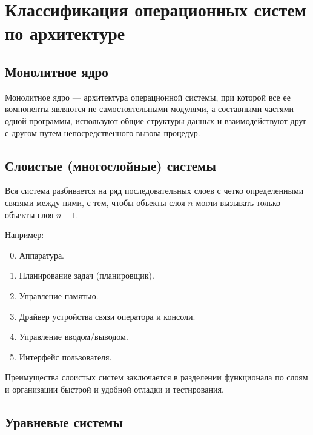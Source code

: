 \section{Классификация операционных систем по архитектуре}
\subsection{Монолитное ядро}
Монолитное ядро --- архитектура операционной системы, при которой все ее
компоненты являются не самостоятельными модулями, а составными частями одной
программы, используют общие структуры данных и взаимодействуют друг с другом
путем непосредственного вызова процедур.
\subsection{Слоистые (многослойные) системы}
Вся система разбивается на ряд последовательных слоев с четко определенными
связями между ними, с тем, чтобы объекты слоя $n$ могли вызывать только объекты
слоя $n - 1$.\par
Например:
\begin{enumerate}
  \setcounter{enumi}{-1}
  \item Аппаратура.
  \item Планирование задач (планировщик).
  \item Управление памятью.
  \item Драйвер устройства связи оператора и консоли.
  \item Управление вводом/выводом.
  \item Интерфейс пользователя.
\end{enumerate}\par
Преимущества слоистых систем заключается в разделении функционала по слоям и
организации быстрой и удобной отладки и тестирования.

\subsection{Уравневые системы}
\begin{figure}[h!]
  \centering
  \label{fig:}
\end{figure}

